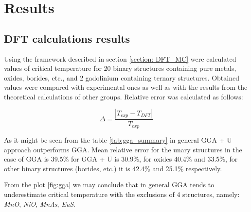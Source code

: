 \chapter{Results}
\section{DFT calculations results}
Using the framework described in section \ref{section: DFT_MC} were calculated values of critical temperature for 20 binary structures containing pure metals, oxides, borides, etc., and 2 gadolinium containing ternary structures.  Obtained values were compared with experimental ones as well as with the results from the theoretical calculations of other groups. Relative error was calculated as follows:

\begin{equation}
\Delta = \frac{\left| T_{exp} - T_{DFT} \right|}{T_{exp}}
\end{equation}

As it might be seen from the table \ref{tab:gga_summary} in general GGA + U approach outperforms GGA.  Mean relative error for the unary structures in the case of GGA is 39.5\% for GGA + U is 30.9\%, for oxides 40.4\% and 33.5\%,  for other binary structures (borides, etc.) it is 42.4\% and 25.1\% respectively. 

From the plot \ref{fig:gga} we may conclude that in general GGA tends to underestimate critical temperature with the exclusions of 4 structures, namely: \textit{MnO}, \textit{NiO}, \textit{MnAs}, \textit{EuS}. 

